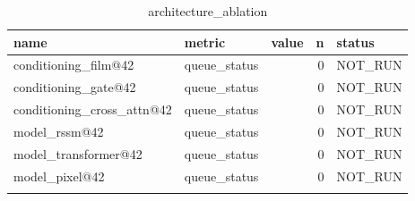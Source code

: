 \begin{table}
\centering
\begin{tabular}{llrrl}
name & metric & value & n & status \\
\hline
conditioning\_film@42 & queue\_status &  & 0 & NOT\_RUN \\
conditioning\_gate@42 & queue\_status &  & 0 & NOT\_RUN \\
conditioning\_cross\_attn@42 & queue\_status &  & 0 & NOT\_RUN \\
model\_rssm@42 & queue\_status &  & 0 & NOT\_RUN \\
model\_transformer@42 & queue\_status &  & 0 & NOT\_RUN \\
model\_pixel@42 & queue\_status &  & 0 & NOT\_RUN \\
\caption{architecture\_ablation}
\end{tabular}
\end{table}
